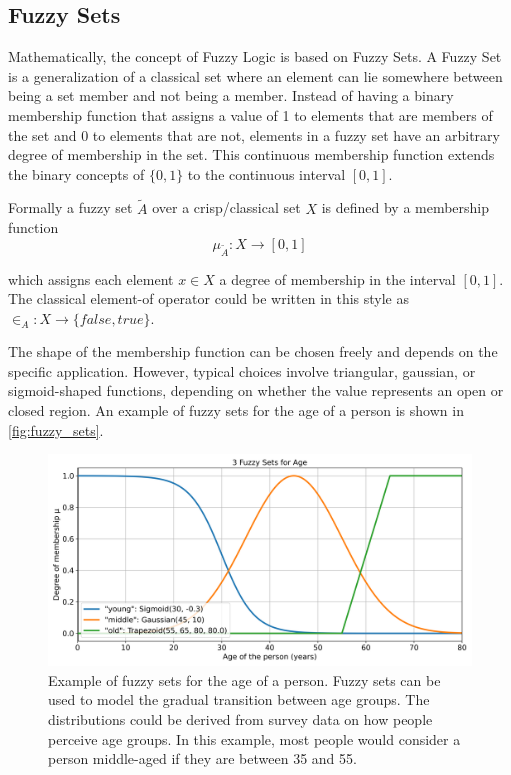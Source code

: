 \subsection{Fuzzy Sets}

Mathematically, the concept of Fuzzy Logic is based on Fuzzy Sets. A Fuzzy Set is a generalization of a classical set where an element can lie somewhere between being a set member and not being a member. Instead of having a binary membership function that assigns a value of 1 to elements that are members of the set and 0 to elements that are not, elements in a fuzzy set have an arbitrary degree of membership in the set. This continuous membership function extends the binary concepts of $\{0, 1\}$ to the continuous interval $[0, 1]$.

Formally a fuzzy set $\tilde{A}$ over a crisp/classical set $X$ is defined by a membership function
\begin{equation}
      \mu_{\tilde{A}}: X \rightarrow [0, 1]
\end{equation}

which assigns each element $x \in X$ a degree of membership in the interval $[0, 1]$. The classical element-of operator could be written in this style as $\in_A: X \rightarrow \{false, true\}$.

The shape of the membership function can be chosen freely and depends on the specific application. However, typical choices involve triangular, gaussian, or sigmoid-shaped functions, depending on whether the value represents an open or closed region. An example of fuzzy sets for the age of a person is shown in \autoref{fig:fuzzy_sets}.


\begin{figure}[H]
      \centering
      \includegraphics[width=0.8\columnwidth,trim={0 0 0 1cm},clip]{figures/Intro/age-fuzzy-sets.png}
      \caption[Example of fuzzy sets for the age of a person.]      {Example of fuzzy sets for the age of a person. Fuzzy sets can be used to model the gradual transition between age groups. The distributions could be derived from survey data on how people perceive age groups. In this example, most people would consider a person middle-aged if they are between 35 and 55.}
      \label{fig:fuzzy_sets}
\end{figure}

